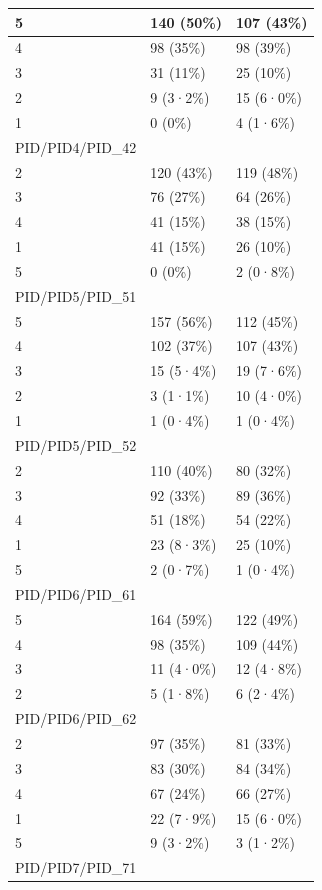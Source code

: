 \documentclass[
]{book}
\begin{document}
\begin{tabular}{l|l|l}
\hline
5 & 140 (50\%) & 107 (43\%)\\
\hline
4 & 98 (35\%) & 98 (39\%)\\
\hline
3 & 31 (11\%) & 25 (10\%)\\
\hline
2 & 9 (3·2\%) & 15 (6·0\%)\\
\hline
1 & 0 (0\%) & 4 (1·6\%)\\
\hline
PID/PID4/PID\_42 &  & \\
\hline
2 & 120 (43\%) & 119 (48\%)\\
\hline
3 & 76 (27\%) & 64 (26\%)\\
\hline
4 & 41 (15\%) & 38 (15\%)\\
\hline
1 & 41 (15\%) & 26 (10\%)\\
\hline
5 & 0 (0\%) & 2 (0·8\%)\\
\hline
PID/PID5/PID\_51 &  & \\
\hline
5 & 157 (56\%) & 112 (45\%)\\
\hline
4 & 102 (37\%) & 107 (43\%)\\
\hline
3 & 15 (5·4\%) & 19 (7·6\%)\\
\hline
2 & 3 (1·1\%) & 10 (4·0\%)\\
\hline
1 & 1 (0·4\%) & 1 (0·4\%)\\
\hline
PID/PID5/PID\_52 &  & \\
\hline
2 & 110 (40\%) & 80 (32\%)\\
\hline
3 & 92 (33\%) & 89 (36\%)\\
\hline
4 & 51 (18\%) & 54 (22\%)\\
\hline
1 & 23 (8·3\%) & 25 (10\%)\\
\hline
5 & 2 (0·7\%) & 1 (0·4\%)\\
\hline
PID/PID6/PID\_61 &  & \\
\hline
5 & 164 (59\%) & 122 (49\%)\\
\hline
4 & 98 (35\%) & 109 (44\%)\\
\hline
3 & 11 (4·0\%) & 12 (4·8\%)\\
\hline
2 & 5 (1·8\%) & 6 (2·4\%)\\
\hline
PID/PID6/PID\_62 &  & \\
\hline
2 & 97 (35\%) & 81 (33\%)\\
\hline
3 & 83 (30\%) & 84 (34\%)\\
\hline
4 & 67 (24\%) & 66 (27\%)\\
\hline
1 & 22 (7·9\%) & 15 (6·0\%)\\
\hline
5 & 9 (3·2\%) & 3 (1·2\%)\\
\hline
PID/PID7/PID\_71 &  & \\

\end{tabular}
\end{document}
